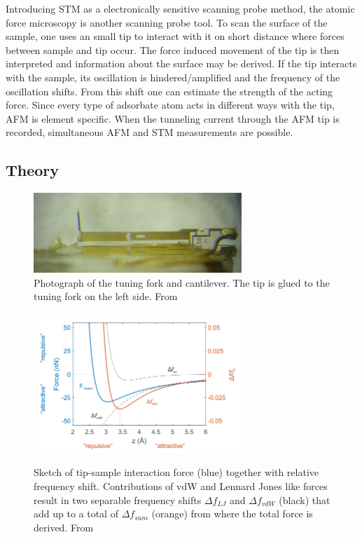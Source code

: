 Introducing STM as a electronically sensitive scanning probe method, the atomic force microscopy is another scanning probe tool. To scan the surface of the sample, one uses an small tip to interact with it on short distance where forces between sample and tip occur. The force induced movement of the tip is then interpreted and information about the surface may be derived. If the tip interacts with the sample, its oscillation is hindered/amplified and the frequency of the oscillation shifts. From this shift one can estimate the strength of the acting force. Since every type of adsorbate atom acts in different ways with the tip, AFM is element specific. When the tunneling current through the AFM tip is recorded, simultaneous AFM and STM measurements are possible. 
\subsection{Theory}

\begin{figure}\centering
	\includegraphics[width=0.7\textwidth]{./images/AFM-qplus-photograph}
	\caption{Photograph of the tuning fork and cantilever. The tip is glued to the tuning fork on the left side. From \cite{he_bottom-up_2017}}
\label{fig:AFM-tuning-fork}
\end{figure}	

\begin{figure}\centering
	\includegraphics[width=0.7\textwidth]{./images/AFM-graph-martin}
		\label{fig:AFM-force}
\caption{Sketch of tip-sample interaction force (blue) together with relative frequency shift. Contributions of vdW and Lennard Jones like forces result in two separable frequency shifts $\Delta f_{LJ}$ and $\Delta f_{vdW}$ (black) that add up to a total of $\Delta f_{sum}$ (orange) from where the total force is derived. From \cite{schwarz_assembly_2018}}
\label{fig:AFM-sketch}%
\end{figure}

